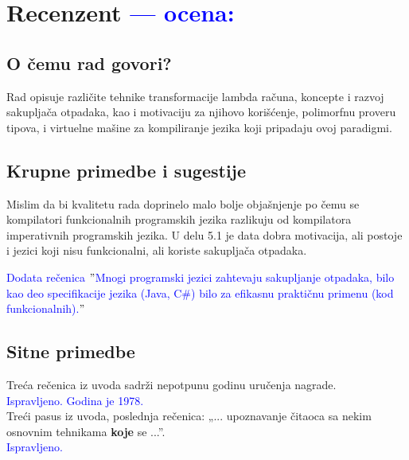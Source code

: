 \documentclass[a4paper]{report}
\newcommand{\odgovor}[1]{\textcolor{blue}{#1}}
\begin{document}
\chapter{Recenzent \odgovor{--- ocena:} }


\section{O čemu rad govori?}
Rad opisuje različite tehnike transformacije lambda računa, koncepte i razvoj sakupljača otpadaka, kao i motivaciju za njihovo korišćenje, polimorfnu proveru tipova, i virtuelne mašine za kompiliranje jezika koji pripadaju ovoj paradigmi.

\section{Krupne primedbe i sugestije}
Mislim da bi kvalitetu rada doprinelo malo bolje objašnjenje po čemu se kompilatori funkcionalnih programskih jezika razlikuju od kompilatora imperativnih programskih jezika. U delu 5.1 je data dobra motivacija, ali postoje i jezici koji nisu funkcionalni, ali koriste sakupljača otpadaka.

\odgovor{Dodata rečenica $"$Mnogi programski jezici zahtevaju sakupljanje otpadaka, bilo kao deo specifikacije jezika (Java, C\#) bilo za efikasnu praktičnu primenu (kod funkcionalnih).$"$ }

\section{Sitne primedbe}
Treća rečenica iz uvoda sadrži nepotpunu godinu uručenja nagrade.\\

\odgovor{Ispravljeno. Godina je 1978.}\\

Treći pasus iz uvoda, poslednja rečenica: „... upoznavanje čitaoca sa nekim osnovnim tehnikama \textbf{koje} se ...”.\\

\odgovor{Ispravljeno.}\\
\end{document}
